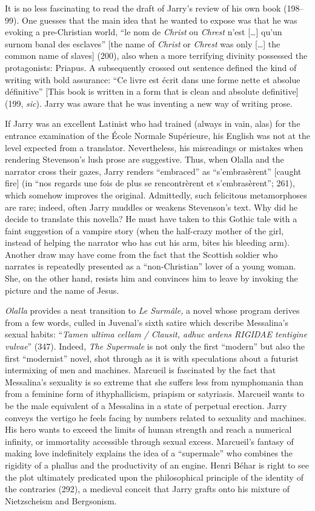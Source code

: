 \documentclass{article}
\begin{document}
\noindent It is no less fascinating to read the draft of Jarry's review of his own
book (198--99). One guesses that the main idea that he wanted to expose
was that he was evoking a pre-Christian world, ``le nom de \emph{Christ} ou \emph{Chrest} n’est [\ldots{}] qu’un surnom banal des esclaves'' [the name of \emph{Christ} or \emph{Chrest} was only [\dots{}] the common name of slaves] (200), also when a more
terrifying divinity possessed the protagonists: Priapus. A subsequently
crossed out sentence defined the kind of writing with bold assurance:
``Ce livre est écrit dans une forme nette et absolue définitive'' [This book is written in a form that is clean and absolute definitive] (199, \emph{sic}). Jarry was aware that he
was inventing a new way of writing prose.

If Jarry was an excellent Latinist who had trained (always in vain,
alas) for the entrance examination of the École Normale Supérieure, his
English was not at the level expected from a translator. Nevertheless,
his misreadings or mistakes when rendering Stevenson's lush prose are
suggestive. Thus, when Olalla and the narrator cross their gazes, Jarry
renders ``embraced'' as ``s'embrasèrent'' {[}caught fire{]} (in ``nos
regards une fois de plus se rencontrèrent et s'embrasèrent''; 261),
which somehow improves the original. Admittedly, such felicitous
metamorphoses are rare; indeed, often Jarry muddles or weakens
Stevenson's text. Why did he decide to translate this novella? He must
have taken to this Gothic tale with a faint suggestion of a vampire
story (when the half-crazy mother of the girl, instead of helping the
narrator who has cut his arm, bites his bleeding arm). Another draw may
have come from the fact that the Scottish soldier who narrates is
repeatedly presented as a ``non-Christian'' lover of a young woman. She,
on the other hand, resists him and convinces him to leave by invoking
the picture and the name of Jesus.

\emph{Olalla} provides a neat transition to \emph{Le Surmâle,} a novel
whose program derives from a few words, culled in Juvenal's sixth satire
which describe Messalina’s sexual habits: ``\emph{Tamen ultima cellam / Clausit,
adhuc ardens RIGIDAE tentigine vulvae}'' (347). Indeed,
\emph{The Supermale} is not only the first ``modern'' but also the first
``modernist'' novel, shot through as it is with speculations about a
futurist intermixing of men and machines. Marcueil is fascinated by the
fact that Messalina's sexuality is so extreme that she suffers less from
nymphomania than from a feminine form of ithyphallicism, priapism or
satyriasis. Marcueil wants to be the male equivalent of a Messalina in a
state of perpetual erection. Jarry conveys the vertigo he feels facing
by numbers related to sexuality and machines. His hero wants to exceed
the limits of human strength and reach a numerical infinity, or
immortality accessible through sexual excess. Marcueil's fantasy of
making love indefinitely explains the idea of a ``supermale'' who
combines the rigidity of a phallus and the productivity of an engine.
Henri Béhar is right to see the plot ultimately predicated upon the
philosophical principle of the identity of the contraries (292), a
medieval conceit that Jarry grafts onto his mixture of Nietzscheism and
Bergsonism.
\end{document}
